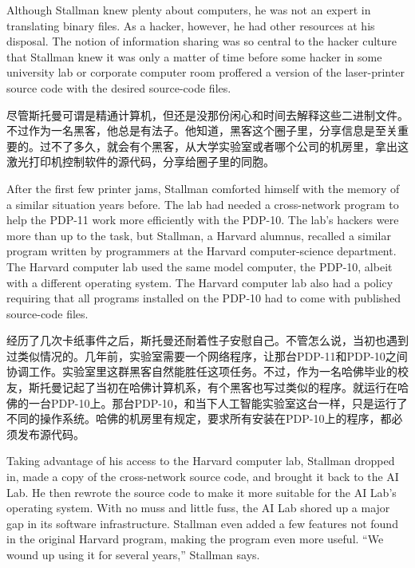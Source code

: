\ifdefined\eng
Although Stallman knew plenty about computers, he was not an expert in translating binary files. As a hacker, however, he had other resources at his disposal. The notion of information sharing was so central to the hacker culture that Stallman knew it was only a matter of time before some hacker in some university lab or corporate computer room proffered a version of the laser-printer source code with the desired source-code files.
\fi

\ifdefined\chs
尽管斯托曼可谓是精通计算机，但还是没那份闲心和时间去解释这些二进制文件。不过作为一名黑客，他总是有法子。他知道，黑客这个圈子里，分享信息是至关重要的。过不了多久，就会有个黑客，从大学实验室或者哪个公司的机房里，拿出这激光打印机控制软件的源代码，分享给圈子里的同胞。
\fi

\ifdefined\eng
After the first few printer jams, Stallman comforted himself with the memory of a similar situation years before. The lab had needed a cross-network program to help the PDP-11 work more efficiently with the PDP-10. The lab's hackers were more than up to the task, but Stallman, a Harvard alumnus, recalled a similar program written by programmers at the Harvard computer-science department. The Harvard computer lab used the same model computer, the PDP-10, albeit with a different operating system. The Harvard computer lab also had a policy requiring that all programs installed on the PDP-10 had to come with published source-code files.
\fi

\ifdefined\chs
经历了几次卡纸事件之后，斯托曼还耐着性子安慰自己。不管怎么说，当初也遇到过类似情况的。几年前，实验室需要一个网络程序，让那台PDP-11和PDP-10之间协调工作。实验室里这群黑客自然能胜任这项任务。不过，作为一名哈佛毕业的校友，斯托曼记起了当初在哈佛计算机系，有个黑客也写过类似的程序。就运行在哈佛的一台PDP-10上。那台PDP-10，和当下人工智能实验室这台一样，只是运行了不同的操作系统。哈佛的机房里有规定，要求所有安装在PDP-10上的程序，都必须发布源代码。
\fi

\ifdefined\eng
Taking advantage of his access to the Harvard computer lab, Stallman dropped in, made a copy of the cross-network source code, and brought it back to the AI Lab. He then rewrote the source code to make it more suitable for the AI Lab's operating system. With no muss and little fuss, the AI Lab shored up a major gap in its software infrastructure. Stallman even added a few features not found in the original Harvard program, making the program even more useful. ``We wound up using it for several years,'' Stallman says.
\fi

